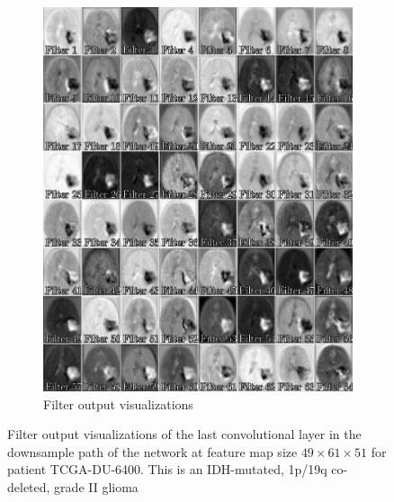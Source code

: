 \begin{subappendices}
\begin{figure}
\begin{subfigure}[b]{0.77\textwidth}
        \includegraphics[width=\textwidth]{Figures/conv_filter_LGG_shallow.pdf}
        \caption{Filter output visualizations}\label{fig:prognosais_filter_lgg_shallow_filter_only}
    \end{subfigure}
    \caption{Filter output visualizations of the last convolutional layer in the downsample path of the network at feature map size $49\times61\times51$ for patient TCGA-DU-6400.
    This is an \acrshort{IDH}-mutated,  1p/19q co-deleted, grade II glioma}\label{fig:filter_lgg_shallow}
\end{figure}


\end{subappendices}
